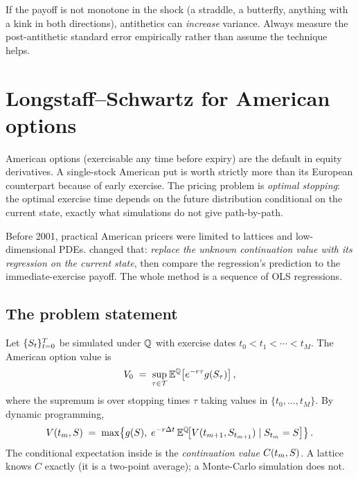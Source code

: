 \begin{pitfallbox}
If the payoff is not monotone in the shock (a straddle, a
butterfly, anything with a kink in both directions), antithetics can
\emph{increase} variance.  Always measure the post-antithetic standard
error empirically rather than assume the technique helps.
\end{pitfallbox}


\section{Longstaff--Schwartz for American options}
\label{sec:longstaff_schwartz}

American options (exercisable any time before expiry) are the default
in equity derivatives.  A single-stock American put is worth strictly
more than its European counterpart because of early exercise.  The
pricing problem is \emph{optimal stopping}: the optimal exercise time
depends on the future distribution conditional on the current state,
exactly what simulations do not give path-by-path.

Before 2001, practical American pricers were limited to lattices and
low-dimensional PDEs.  \citet{longstaffschwartz2001} changed that:
\emph{replace the unknown continuation value with its regression on
the current state}, then compare the regression's prediction to the
immediate-exercise payoff.  The whole method is a sequence of OLS
regressions.

\subsection{The problem statement}

Let $\{S_t\}_{t=0}^{T}$ be simulated under $\mathbb{Q}$ with exercise
dates $t_0 < t_1 < \cdots < t_M$.  The American option value is
\begin{equation}
  V_0 \;=\; \sup_{\tau \in \mathcal{T}} \mathbb{E}^{\mathbb{Q}}\!\left[
            e^{-r \tau} g(S_\tau) \right],
\end{equation}
where the supremum is over stopping times $\tau$ taking values in
$\{t_0, \ldots, t_M\}$.  By dynamic programming,
\begin{equation}
\label{eq:dpeqn}
  V(t_m, S) \;=\; \max\!\left\{
    g(S),\;
    e^{-r \Delta t}\, \mathbb{E}^{\mathbb{Q}}\!\bigl[ V(t_{m+1}, S_{t_{m+1}})
                                         \mid S_{t_m} = S \bigr]
  \right\}.
\end{equation}
The conditional expectation inside is the \emph{continuation value}
$C(t_m, S)$.  A lattice knows $C$ exactly (it is a two-point
average); a Monte-Carlo simulation does not.

